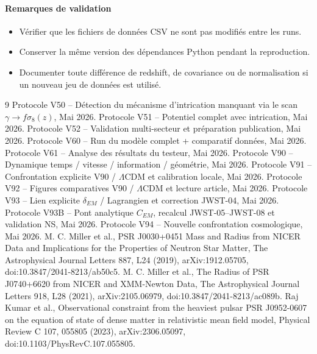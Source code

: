 \documentclass[11pt,a4paper]{article}
\begin{document}
\paragraph{Remarques de validation}
\begin{itemize}
\item Vérifier que les fichiers de données CSV ne sont pas modifiés entre les runs.
\item Conserver la même version des dépendances Python pendant la reproduction.
\item Documenter toute différence de redshift, de covariance ou de normalisation si un nouveau jeu de données est utilisé.
\end{itemize}

\begin{thebibliography}{9}
 Protocole V50 -- Détection du mécanisme d'intrication manquant via le scan $\gamma \to f\sigma_8(z)$, Mai 2026.
 Protocole V51 -- Potentiel complet avec intrication, Mai 2026.
 Protocole V52 -- Validation multi-secteur et préparation publication, Mai 2026.
 Protocole V60 -- Run du modèle complet + comparatif données, Mai 2026.
 Protocole V61 -- Analyse des résultats du testeur, Mai 2026.
 Protocole V90 -- Dynamique temps / vitesse / information / géométrie, Mai 2026.
 Protocole V91 -- Confrontation explicite V90 / $\Lambda$CDM et calibration locale, Mai 2026.
 Protocole V92 -- Figures comparatives V90 / $\Lambda$CDM et lecture article, Mai 2026.
 Protocole V93 -- Lien explicite $\delta_{EM}$ / Lagrangien et correction JWST-04, Mai 2026.
 Protocole V93B -- Pont analytique $C_{EM}$, recalcul JWST-05--JWST-08 et validation NS, Mai 2026.
 Protocole V94 -- Nouvelle confrontation cosmologique, Mai 2026.
 M. C. Miller et al., PSR J0030+0451 Mass and Radius from NICER Data and Implications for the Properties of Neutron Star Matter, The Astrophysical Journal Letters 887, L24 (2019), arXiv:1912.05705, doi:10.3847/2041-8213/ab50c5.
 M. C. Miller et al., The Radius of PSR J0740+6620 from NICER and XMM-Newton Data, The Astrophysical Journal Letters 918, L28 (2021), arXiv:2105.06979, doi:10.3847/2041-8213/ac089b.
 Raj Kumar et al., Observational constraint from the heaviest pulsar PSR J0952-0607 on the equation of state of dense matter in relativistic mean field model, Physical Review C 107, 055805 (2023), arXiv:2306.05097, doi:10.1103/PhysRevC.107.055805.
\end{thebibliography}
\end{document}
